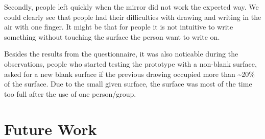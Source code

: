 \documentclass{sigchi-ext}
\begin{document}
Secondly, people left quickly when the mirror did not work the expected way. We could clearly see that people had their difficulties with drawing and writing in the air with one finger. It might be that for people it is not intuitive to write something without touching the surface the person want to write on.

Besides the results from the questionnaire, it was also noticable during the observations, people who started testing the prototype with a non-blank surface, asked for a new blank surface if the previous drawing occupied more than \textasciitilde20\% of the surface. Due to the small given surface, the surface was most of the time too full after the use of one person/group.

\section{Future Work}

\end{document}
